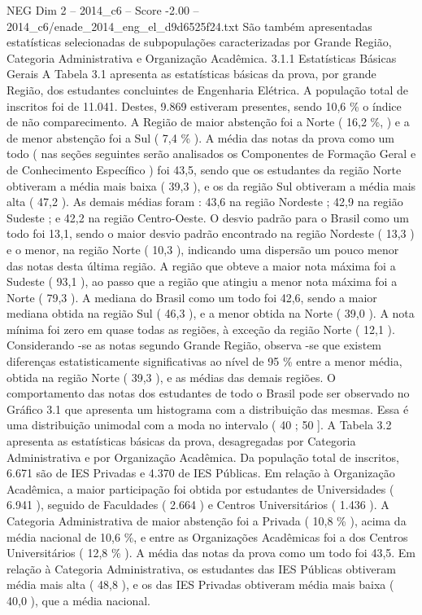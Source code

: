 \begin{textsample}{NEG Dim 2 – 2014\_c6 – Score -2.00 – 2014\_c6/enade\_2014\_eng\_el\_d9d6525f24.txt}
São também apresentadas estatísticas selecionadas de subpopulações caracterizadas por Grande Região, Categoria Administrativa e Organização Acadêmica. 3.1.1 Estatísticas Básicas Gerais A Tabela 3.1 apresenta as estatísticas básicas da prova, por grande Região, dos estudantes concluintes de Engenharia Elétrica.
A população total de inscritos foi de 11.041.
Destes, 9.869 estiveram presentes, sendo 10,6 \% o índice de não comparecimento.
A Região de maior abstenção foi a Norte ( 16,2 \%, ) e a de menor abstenção foi a Sul ( 7,4 \% ).
A média das notas da prova como um todo ( nas seções seguintes serão analisados os Componentes de Formação Geral e de Conhecimento Específico ) foi 43,5, sendo que os estudantes da região Norte obtiveram a média mais baixa ( 39,3 ), e os da região Sul obtiveram a média mais alta ( 47,2 ).
As demais médias foram : 43,6 na região Nordeste ; 42,9 na região Sudeste ; e 42,2 na região Centro-Oeste.
O desvio padrão para o Brasil como um todo foi 13,1, sendo o maior desvio padrão encontrado na região Nordeste ( 13,3 ) e o menor, na região Norte ( 10,3 ), indicando uma dispersão um pouco menor das notas desta última região.
A região que obteve a maior nota máxima foi a Sudeste ( 93,1 ), ao passo que a região que atingiu a menor nota máxima foi a Norte ( 79,3 ).
A mediana do Brasil como um todo foi 42,6, sendo a maior mediana obtida na região Sul ( 46,3 ), e a menor obtida na Norte ( 39,0 ).
A nota mínima foi zero em quase todas as regiões, à exceção da região Norte ( 12,1 ).
Considerando -se as notas segundo Grande Região, observa -se que existem diferenças estatisticamente significativas ao nível de 95 \% entre a menor média, obtida na região Norte ( 39,3 ), e as médias das demais regiões.
O comportamento das notas dos estudantes de todo o Brasil pode ser observado no Gráfico 3.1 que apresenta um histograma com a distribuição das mesmas.
Essa é uma distribuição unimodal com a moda no intervalo ( 40 ; 50 ].
A Tabela 3.2 apresenta as estatísticas básicas da prova, desagregadas por Categoria Administrativa e por Organização Acadêmica.
Da população total de inscritos, 6.671 são de IES Privadas e 4.370 de IES Públicas.
Em relação à Organização Acadêmica, a maior participação foi obtida por estudantes de Universidades ( 6.941 ), seguido de Faculdades ( 2.664 ) e Centros Universitários ( 1.436 ).
A Categoria Administrativa de maior abstenção foi a Privada ( 10,8 \% ), acima da média nacional de 10,6 \%, e entre as Organizações Acadêmicas foi a dos Centros Universitários ( 12,8 \% ).
A média das notas da prova como um todo foi 43,5.
Em relação à Categoria Administrativa, os estudantes das IES Públicas obtiveram média mais alta ( 48,8 ), e os das IES Privadas obtiveram média mais baixa ( 40,0 ), que a média nacional.

\end{textsample}

